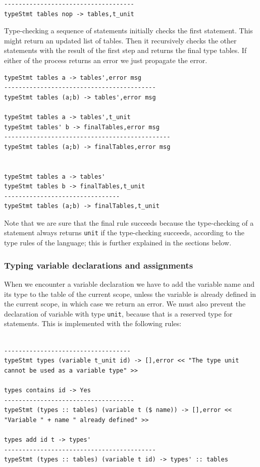 \begin{lstlisting}
------------------------------------
typeStmt tables nop -> tables,t_unit
\end{lstlisting}

\noindent
Type-checking a sequence of statements initially checks the first statement. This might return an updated list of tables. Then it recursively checks the other statements with the result of the first step and returns the final type tables. If either of the process returns an error we just propagate the error.

\begin{lstlisting}
typeStmt tables a -> tables',error msg
------------------------------------------
typeStmt tables (a;b) -> tables',error msg

typeStmt tables a -> tables',t_unit
typeStmt tables' b -> finalTables,error msg
----------------------------------------------
typeStmt tables (a;b) -> finalTables,error msg


typeStmt tables a -> tables'
typeStmt tables b -> finalTables,t_unit
--------------------------------
typeStmt tables (a;b) -> finalTables,t_unit
\end{lstlisting}

\noindent
Note that we are sure that the final rule succeeds because the type-checking of a statement always returns \texttt{unit} if the type-checking succeeds, according to the type rules of the language; this is further explained in the sections below.

\subsubsection{Typing variable declarations and assignments}
When we encounter a variable declaration we have to add the variable name and its type to the table of the current scope, unless the variable is already defined in the current scope, in which case we return an error. We must also prevent the declaration of variable with type \texttt{unit}, because that is a reserved type for statements. This is implemented with the following rules:

\begin{lstlisting}

-----------------------------------
typeStmt types (variable t_unit id) -> [],error << "The type unit cannot be used as a variable type" >>

types contains id -> Yes
------------------------------------
typeStmt (types :: tables) (variable t ($ name)) -> [],error << "Variable " + name " already defined" >>

types add id t -> types'
------------------------------------------
typeStmt (types :: tables) (variable t id) -> types' :: tables
\end{lstlisting}

